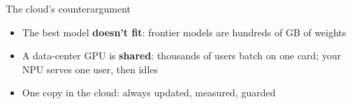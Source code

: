 \begin{frame}{The cloud's counterargument}
  \vspace{0.6em}
  \raggedright
  \begin{itemize}[<+->]\itemsep7pt
    \item The best model \textbf{doesn't fit}: frontier models are hundreds of
      GB of weights
    \item A data-center GPU is \textbf{shared}: thousands of users batch on one
      card; your NPU serves one user, then idles
    \item One copy in the cloud: always updated, measured, guarded
  \end{itemize}

  \vspace{0.9em}

  \vspace{0.4em}
\end{frame}
